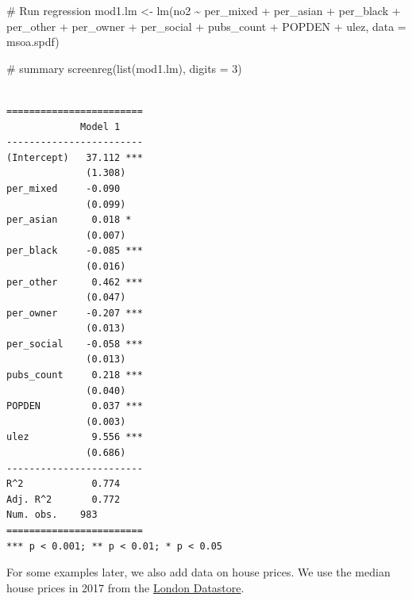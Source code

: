 \documentclass[
  letterpaper,
  DIV=11,
  numbers=noendperiod]{scrreprt}
\newenvironment{Shaded}{\begin{snugshade}}{\end{snugshade}}
\newcommand{\AttributeTok}[1]{\textcolor[rgb]{0.40,0.45,0.13}{#1}}
\newcommand{\CommentTok}[1]{\textcolor[rgb]{0.37,0.37,0.37}{#1}}
\newcommand{\DecValTok}[1]{\textcolor[rgb]{0.68,0.00,0.00}{#1}}
\newcommand{\FunctionTok}[1]{\textcolor[rgb]{0.28,0.35,0.67}{#1}}
\newcommand{\NormalTok}[1]{\textcolor[rgb]{0.00,0.23,0.31}{#1}}
\newcommand{\OtherTok}[1]{\textcolor[rgb]{0.00,0.23,0.31}{#1}}
\newcommand{\SpecialCharTok}[1]{\textcolor[rgb]{0.37,0.37,0.37}{#1}}
\newcommand{\StringTok}[1]{\textcolor[rgb]{0.13,0.47,0.30}{#1}}
\begin{document}
\begin{Shaded}
\begin{Highlighting}[]
\CommentTok{\# Run regression}
\NormalTok{mod1.lm }\OtherTok{\textless{}{-}} \FunctionTok{lm}\NormalTok{(no2 }\SpecialCharTok{\textasciitilde{}}\NormalTok{ per\_mixed }\SpecialCharTok{+}\NormalTok{ per\_asian }\SpecialCharTok{+}\NormalTok{ per\_black }\SpecialCharTok{+}\NormalTok{ per\_other }\SpecialCharTok{+}
\NormalTok{                per\_owner }\SpecialCharTok{+}\NormalTok{ per\_social }\SpecialCharTok{+}\NormalTok{ pubs\_count }\SpecialCharTok{+}\NormalTok{ POPDEN }\SpecialCharTok{+}\NormalTok{ ulez,}
              \AttributeTok{data =}\NormalTok{ msoa.spdf)}

\CommentTok{\# summary}
\FunctionTok{screenreg}\NormalTok{(}\FunctionTok{list}\NormalTok{(mod1.lm), }\AttributeTok{digits =} \DecValTok{3}\NormalTok{)}
\end{Highlighting}
\end{Shaded}

\begin{verbatim}

========================
             Model 1    
------------------------
(Intercept)   37.112 ***
              (1.308)   
per_mixed     -0.090    
              (0.099)   
per_asian      0.018 *  
              (0.007)   
per_black     -0.085 ***
              (0.016)   
per_other      0.462 ***
              (0.047)   
per_owner     -0.207 ***
              (0.013)   
per_social    -0.058 ***
              (0.013)   
pubs_count     0.218 ***
              (0.040)   
POPDEN         0.037 ***
              (0.003)   
ulez           9.556 ***
              (0.686)   
------------------------
R^2            0.774    
Adj. R^2       0.772    
Num. obs.    983        
========================
*** p < 0.001; ** p < 0.01; * p < 0.05
\end{verbatim}

For some examples later, we also add data on house prices. We use the
median house prices in 2017 from the
\href{https://data.london.gov.uk/dataset/average-house-prices}{London
Datastore}.

\begin{Shaded}
\end{Shaded}
\end{document}
